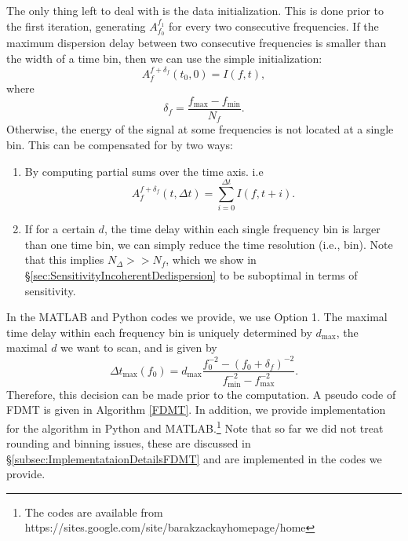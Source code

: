 \documentclass[iop]{emulateapj}
\begin{document}
The only thing left to deal with is the data initialization.
This is done prior to the first iteration, generating 
$ A_{f_0}^{f_1}$ for every two consecutive frequencies.
If the maximum dispersion delay between two consecutive frequencies is smaller than the width of a time bin, then we can use the simple initialization:
\begin{equation}
 A_{f}^{f + \delta_f}(t_0,0) = I(f,t),
\end{equation}
where \begin{equation}\delta_f = \frac{f_{\max} - f_{\min}}{N_f}.\end{equation}
Otherwise, the energy of the signal at some frequencies is not located at a single bin. This can be compensated for by two ways:
\begin{enumerate}
\item By computing partial sums over the time axis. i.e 
\begin{equation}
A_{f}^{f + \delta_f}(t,\Delta t) = \sum_{i=0}^{\Delta t}{I(f,t+i)}.
\end{equation}
\item If for a certain $d$, the time delay within each single frequency bin is larger than one time bin, we can simply reduce the time resolution (i.e., bin).
Note that this implies $N_\Delta>>N_f$, which we show in \S \ref{sec:SensitivityIncoherentDedispersion} to be suboptimal in terms of sensitivity.
\end{enumerate}
In the MATLAB and Python codes we provide, we use Option 1.
The maximal time delay within each frequency bin is uniquely determined by $d_{\max}$, the maximal $d$ we want to scan, and is given by
\begin{equation}
\Delta t_{\max}(f_0) =  d_{\max}\frac{f_0^{-2} - (f_0 + \delta_f)^{-2}} {f_{\min}^{-2} - f_{\max}^{-2}}.
\end{equation}
Therefore, this decision can be made prior to the computation.
A pseudo code of FDMT is given in Algorithm \ref{FDMT}.
In addition, we provide implementation for the algorithm in Python and MATLAB.\footnote{The codes are available from https://sites.google.com/site/barakzackayhomepage/home}
Note that so far we did not treat rounding and binning issues, these are discussed in \S \ref{subsec:ImplementataionDetailsFDMT} and are implemented in the codes we provide.
\end{document}
